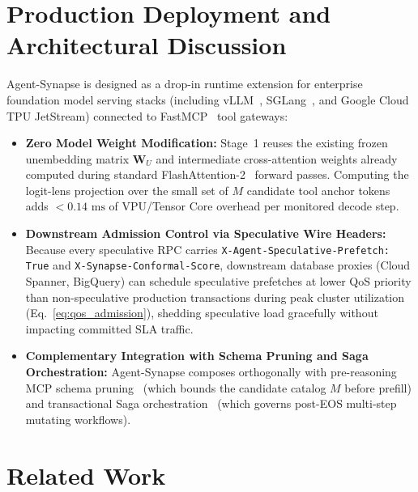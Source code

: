 \documentclass[10pt,conference]{IEEEtran}
\begin{document}
\section{Production Deployment and Architectural Discussion}
\label{sec:discussion}

Agent-Synapse is designed as a drop-in runtime extension for enterprise foundation model serving stacks (including vLLM~\cite{kwon2023efficient}, SGLang~\cite{zheng2024sglang}, and Google Cloud TPU JetStream) connected to FastMCP~\cite{anthropic2024mcp} tool gateways:
\begin{itemize}
    \item \textbf{Zero Model Weight Modification:} Stage~1 reuses the existing frozen unembedding matrix $\mathbf{W}_U$ and intermediate cross-attention weights already computed during standard FlashAttention-2~\cite{dao2024flashattention2} forward passes. Computing the logit-lens projection over the small set of $M$ candidate tool anchor tokens adds $< 0.14\text{ ms}$ of VPU/Tensor Core overhead per monitored decode step.
    \item \textbf{Downstream Admission Control via Speculative Wire Headers:} Because every speculative RPC carries \texttt{X-Agent-Speculative-Prefetch: True} and \texttt{X-Synapse-Conformal-Score}, downstream database proxies (Cloud Spanner, BigQuery) can schedule speculative prefetches at lower QoS priority than non-speculative production transactions during peak cluster utilization (Eq.~\eqref{eq:qos_admission}), shedding speculative load gracefully without impacting committed SLA traffic.
    \item \textbf{Complementary Integration with Schema Pruning and Saga Orchestration:} Agent-Synapse composes orthogonally with pre-reasoning MCP schema pruning~\cite{lumer2025scalemcp, gan2025ragmcp} (which bounds the candidate catalog $M$ before prefill) and transactional Saga orchestration~\cite{garciamolina1987sagas, geng2025sagallm} (which governs post-EOS multi-step mutating workflows).
\end{itemize}

\section{Related Work}
\label{sec:related}
\end{document}
